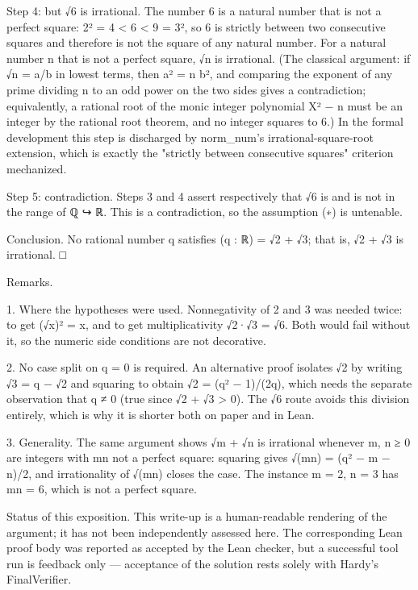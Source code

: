 \documentclass[11pt]{article}
\begin{document}
Step 4: but √6 is irrational. The number 6 is a natural number that is not a perfect square: 2² = 4 < 6 < 9 = 3², so 6 is strictly between two consecutive squares and therefore is not the square of any natural number. For a natural number n that is not a perfect square, √n is irrational. (The classical argument: if √n = a/b in lowest terms, then a² = n b², and comparing the exponent of any prime dividing n to an odd power on the two sides gives a contradiction; equivalently, a rational root of the monic integer polynomial X² − n must be an integer by the rational root theorem, and no integer squares to 6.) In the formal development this step is discharged by norm\_num's irrational-square-root extension, which is exactly the "strictly between consecutive squares" criterion mechanized.

Step 5: contradiction. Steps 3 and 4 assert respectively that √6 is and is not in the range of ℚ ↪ ℝ. This is a contradiction, so the assumption (∗) is untenable.

Conclusion. No rational number q satisfies (q : ℝ) = √2 + √3; that is, √2 + √3 is irrational. □

Remarks.

1. Where the hypotheses were used. Nonnegativity of 2 and 3 was needed twice: to get (√x)² = x, and to get multiplicativity √2·√3 = √6. Both would fail without it, so the numeric side conditions are not decorative.

2. No case split on q = 0 is required. An alternative proof isolates √2 by writing √3 = q − √2 and squaring to obtain √2 = (q² − 1)/(2q), which needs the separate observation that q ≠ 0 (true since √2 + √3 > 0). The √6 route avoids this division entirely, which is why it is shorter both on paper and in Lean.

3. Generality. The same argument shows √m + √n is irrational whenever m, n ≥ 0 are integers with mn not a perfect square: squaring gives √(mn) = (q² − m − n)/2, and irrationality of √(mn) closes the case. The instance m = 2, n = 3 has mn = 6, which is not a perfect square.

Status of this exposition. This write-up is a human-readable rendering of the argument; it has not been independently assessed here. The corresponding Lean proof body was reported as accepted by the Lean checker, but a successful tool run is feedback only — acceptance of the solution rests solely with Hardy's FinalVerifier.
\end{document}
